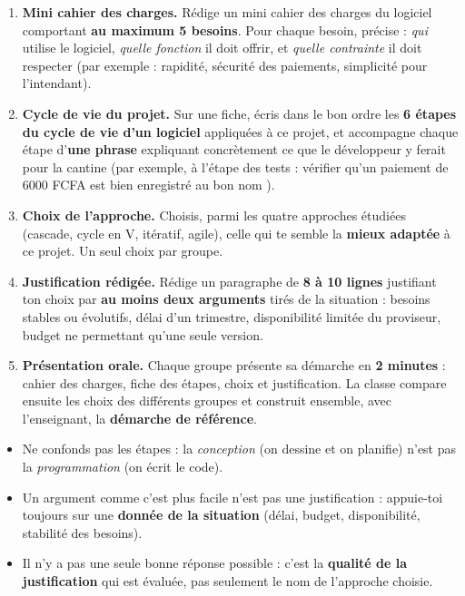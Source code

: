\documentclass[11pt]{article}
\begin{document}
\begin{enumerate}
  \item \textbf{Mini cahier des charges.} Rédige un mini cahier des charges du logiciel comportant \textbf{au maximum 5 besoins}. Pour chaque besoin, précise : \emph{qui} utilise le logiciel, \emph{quelle fonction} il doit offrir, et \emph{quelle contrainte} il doit respecter (par exemple : rapidité, sécurité des paiements, simplicité pour l'intendant).
  \item \textbf{Cycle de vie du projet.} Sur une fiche, écris dans le bon ordre les \textbf{6 étapes du cycle de vie d'un logiciel} appliquées à ce projet, et accompagne chaque étape d'\textbf{une phrase} expliquant concrètement ce que le développeur y ferait pour la cantine (par exemple, à l'étape des tests : \og vérifier qu'un paiement de 6000 FCFA est bien enregistré au bon nom \fg).
  \item \textbf{Choix de l'approche.} Choisis, parmi les quatre approches étudiées (cascade, cycle en V, itératif, agile), celle qui te semble la \textbf{mieux adaptée} à ce projet. Un seul choix par groupe.
  \item \textbf{Justification rédigée.} Rédige un paragraphe de \textbf{8 à 10 lignes} justifiant ton choix par \textbf{au moins deux arguments} tirés de la situation : besoins stables ou évolutifs, délai d'un trimestre, disponibilité limitée du proviseur, budget ne permettant qu'une seule version.
  \item \textbf{Présentation orale.} Chaque groupe présente sa démarche en \textbf{2 minutes} : cahier des charges, fiche des étapes, choix et justification. La classe compare ensuite les choix des différents groupes et construit ensemble, avec l'enseignant, la \textbf{démarche de référence}.
\end{enumerate}

\begin{attention}
\begin{itemize}
  \item Ne confonds pas les étapes : la \emph{conception} (on dessine et on planifie) n'est pas la \emph{programmation} (on écrit le code).
  \item Un argument comme \og c'est plus facile \fg{} n'est pas une justification : appuie-toi toujours sur une \textbf{donnée de la situation} (délai, budget, disponibilité, stabilité des besoins).
  \item Il n'y a pas une seule bonne réponse possible : c'est la \textbf{qualité de la justification} qui est évaluée, pas seulement le nom de l'approche choisie.
\end{itemize}
\end{attention}
\end{document}
